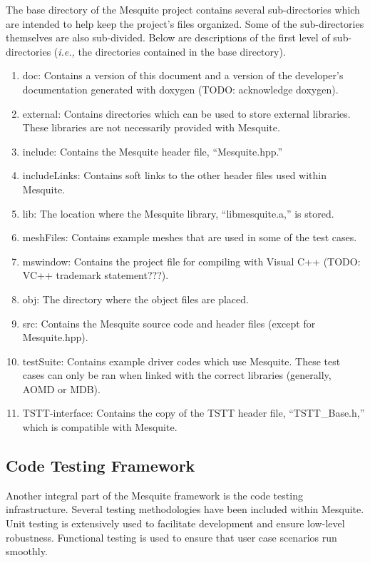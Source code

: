 \documentclass[letter]{report}
\begin{document}
The base directory of the Mesquite project contains several
sub-directories which are intended to help keep the project's
files organized.  Some of the sub-directories themselves are
also sub-divided.  Below are descriptions of the first level
of sub-directories ({\it i.e.,} the directories contained in the
base directory).
\begin{enumerate}
\item doc:  Contains a version of this document and a version of
the developer's documentation generated with doxygen (TODO: acknowledge
doxygen).
\item external:  Contains directories which can be used to store external
libraries.  These libraries are not necessarily provided with Mesquite.
\item include:  Contains the Mesquite header file, ``Mesquite.hpp.''
\item includeLinks:  Contains soft links to the other header files
used within Mesquite.  
\item lib:  The location where the Mesquite library, ``libmesquite.a,'' is
stored.
\item meshFiles:  Contains example meshes that are used in some of
the test cases.
\item mswindow:  Contains the project file for compiling with Visual C++
(TODO: VC++ trademark statement???).
\item obj:  The directory where the object files are placed.
\item src:  Contains the Mesquite source code and header files (except for
Mesquite.hpp).
\item testSuite:  Contains example driver codes which use Mesquite.  These
test cases can only be ran when linked with the correct libraries (generally,
AOMD or MDB).
\item TSTT-interface:  Contains the copy of the TSTT header file,
``TSTT\_Base.h,'' which is compatible with Mesquite.
\end{enumerate}

\subsection{Code Testing Framework}

Another integral part of the Mesquite framework is the code testing
infrastructure.  Several testing methodologies have been included
within Mesquite. Unit testing is extensively used to facilitate
development and ensure low-level robustness. Functional testing is
used to ensure that user case scenarios run smoothly.
\end{document}
